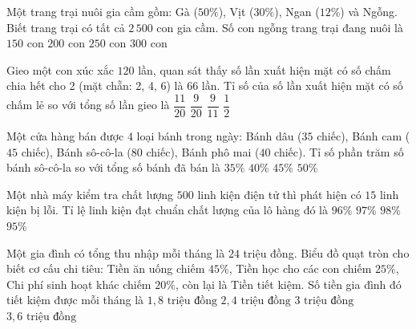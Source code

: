 \begin{ex} %
Một trang trại nuôi gia cầm gồm: Gà ($50\%$), Vịt ($30\%$), Ngan ($12\%$) và Ngỗng. Biết trang trại có tất cả $2\,500$ con gia cầm. Số con ngỗng trang trại đang nuôi là
\choice
{$150$ con}
{\True $200$ con}
{$250$ con}
{$300$ con}
\end{ex}

\begin{ex} %
Gieo một con xúc xắc $120$ lần, quan sát thấy số lần xuất hiện mặt có số chấm chia hết cho 2 (mặt chẵn: 2, 4, 6) là $66$ lần. Tỉ số của số lần xuất hiện mặt có số chấm lẻ so với tổng số lần gieo là
\choice
{$\dfrac{11}{20}$}
{\True $\dfrac{9}{20}$}
{$\dfrac{9}{11}$}
{$\dfrac{1}{2}$}
\end{ex}

\begin{ex} %
Một cửa hàng bán được $4$ loại bánh trong ngày: Bánh dâu ($35$ chiếc), Bánh cam ($45$ chiếc), Bánh sô-cô-la ($80$ chiếc), Bánh phô mai ($40$ chiếc). Tỉ số phần trăm số bánh sô-cô-la so với tổng số bánh đã bán là
\choice
{$35\%$}
{\True $40\%$}
{$45\%$}
{$50\%$}
\end{ex}

\begin{ex} %
Một nhà máy kiểm tra chất lượng $500$ linh kiện điện tử thì phát hiện có $15$ linh kiện bị lỗi. Tỉ lệ linh kiện đạt chuẩn chất lượng của lô hàng đó là
\choice
{$96\%$}
{\True $97\%$}
{$98\%$}
{$95\%$}
\end{ex}

\begin{ex} %
Một gia đình có tổng thu nhập mỗi tháng là $24$ triệu đồng. Biểu đồ quạt tròn cho biết cơ cấu chi tiêu: Tiền ăn uống chiếm $45\%$, Tiền học cho các con chiếm $25\%$, Chi phí sinh hoạt khác chiếm $20\%$, còn lại là Tiền tiết kiệm. Số tiền gia đình đó tiết kiệm được mỗi tháng là
\choice
{$1{,}8\text{ triệu đồng}$}
{\True $2{,}4\text{ triệu đồng}$}
{$3\text{ triệu đồng}$}
{$3{,}6\text{ triệu đồng}$}
\end{ex}


